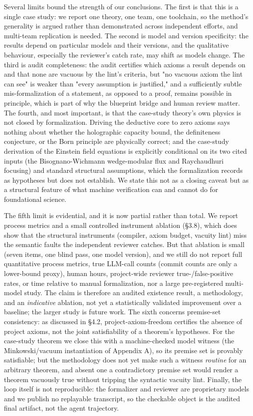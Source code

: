 \documentclass[11pt]{article}
\begin{document}
Several limits bound the strength of our conclusions. The first is that this is a single case study:
we report one theory, one team, one toolchain, so the method's generality is argued rather than
demonstrated across independent efforts, and multi-team replication is needed. The second is model
and version specificity: the results depend on particular models and their versions, and the
qualitative behaviour, especially the reviewer's catch rate, may shift as models change. The third
is audit completeness: the audit certifies which axioms a result depends on and that none are
vacuous by the lint's criteria, but "no vacuous axiom the lint can see" is weaker than "every
assumption is justified," and a sufficiently subtle mis-formalization of a statement, as opposed to
a proof, remains possible in principle, which is part of why the blueprint bridge and human review
matter. The fourth, and most important, is that the case-study theory's own physics is not closed by
formalization. Driving the deductive core to zero axioms says nothing about whether the holographic
capacity bound, the definiteness conjecture, or the Born principle are physically correct; and the
case-study derivation of the Einstein field equations is explicitly conditional on its two cited inputs
(the Bisognano-Wichmann wedge-modular flux and Raychaudhuri focusing) and standard structural
assumptions, which the formalization records as hypotheses but does not establish. We state this not
as a closing caveat but as a structural feature of what machine verification can and cannot do for
foundational science.

The fifth limit is evidential, and it is now partial rather than total. We report process metrics and
a small controlled instrument ablation (§3.8), which does show that the structural instruments
(compiler, axiom budget, vacuity lint) miss the semantic faults the independent reviewer catches. But
that ablation is small (seven items, one blind pass, one model version), and we still do not report
full quantitative process metrics, true LLM-call counts (commit counts are only a lower-bound proxy),
human hours, project-wide reviewer true-/false-positive rates, or time relative to manual
formalization, nor a large pre-registered multi-model study. The claim is therefore an audited
existence result, a methodology, and an \emph{indicative} ablation, not yet a statistically validated
improvement over a baseline; the larger study is future work. The sixth concerns premise-set consistency: as discussed in §4.2,
project-axiom-freedom certifies the absence of project axioms, not the joint satisfiability of a
theorem's hypotheses. For the case-study theorem we close this with a machine-checked
model witness (the Minkowski/vacuum instantiation of Appendix A), so its premise set is provably
satisfiable; but the methodology does not yet make such a witness \emph{routine} for an arbitrary theorem,
and absent one a contradictory premise set would render a theorem vacuously true without tripping the
syntactic vacuity lint. Finally, the loop
itself is not reproducible: the formalizer and reviewer are proprietary models and we publish no
replayable transcript, so the checkable object is the audited final artifact, not the agent
trajectory.
\end{document}
